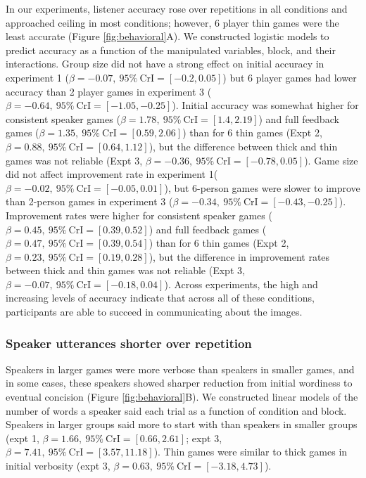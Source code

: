 \documentclass[
  english,
  a4paper,
]{article}
\begin{document}
In our experiments, listener accuracy rose over repetitions in all conditions and approached ceiling in most conditions; however, 6 player thin games were the least accurate (Figure \ref{fig:behavioral}A). We constructed logistic models to predict accuracy as a function of the manipulated variables, block, and their interactions. Group size did not have a strong effect on initial accuracy in experiment 1 (\(\beta=-0.07,\:95\%\:\mathrm{CrI}=[-0.2, 0.05]\)) but 6 player games had lower accuracy than 2 player games in experiment 3 (\(\beta=-0.64,\:95\%\:\mathrm{CrI}=[-1.05, -0.25]\)). Initial accuracy was somewhat higher for consistent speaker games (\(\beta=1.78,\:95\%\:\mathrm{CrI}=[1.4, 2.19]\)) and full feedback games (\(\beta=1.35,\:95\%\:\mathrm{CrI}=[0.59, 2.06]\)) than for 6 thin games (Expt 2, \(\beta=0.88,\:95\%\:\mathrm{CrI}=[0.64, 1.12]\)), but the difference between thick and thin games was not reliable (Expt 3, \(\beta=-0.36,\:95\%\:\mathrm{CrI}=[-0.78, 0.05]\)). Game size did not affect improvement rate in experiment 1(\(\beta=-0.02,\:95\%\:\mathrm{CrI}=[-0.05, 0.01]\)), but 6-person games were slower to improve than 2-person games in experiment 3 (\(\beta=-0.34,\:95\%\:\mathrm{CrI}=[-0.43, -0.25]\)). Improvement rates were higher for consistent speaker games (\(\beta=0.45,\:95\%\:\mathrm{CrI}=[0.39, 0.52]\)) and full feedback games (\(\beta=0.47,\:95\%\:\mathrm{CrI}=[0.39, 0.54]\)) than for 6 thin games (Expt 2, \(\beta=0.23,\:95\%\:\mathrm{CrI}=[0.19, 0.28]\)), but the difference in improvement rates between thick and thin games was not reliable (Expt 3, \(\beta=-0.07,\:95\%\:\mathrm{CrI}=[-0.18, 0.04]\)). Across experiments, the high and increasing levels of accuracy indicate that across all of these conditions, participants are able to succeed in communicating about the images.

\hypertarget{speaker-utterances-shorter-over-repetition}{%
\subsubsection{Speaker utterances shorter over repetition}\label{speaker-utterances-shorter-over-repetition}}

Speakers in larger games were more verbose than speakers in smaller games, and in some cases, these speakers showed sharper reduction from initial wordiness to eventual concision (Figure \ref{fig:behavioral}B). We constructed linear models of the number of words a speaker said each trial as a function of condition and block. Speakers in larger groups said more to start with than speakers in smaller groups (expt 1, \(\beta=1.66,\:95\%\:\mathrm{CrI}=[0.66, 2.61]\); expt 3, \(\beta=7.41,\:95\%\:\mathrm{CrI}=[3.57, 11.18]\)). Thin games were similar to thick games in initial verbosity (expt 3, \(\beta=0.63,\:95\%\:\mathrm{CrI}=[-3.18, 4.73]\)).
\end{document}
